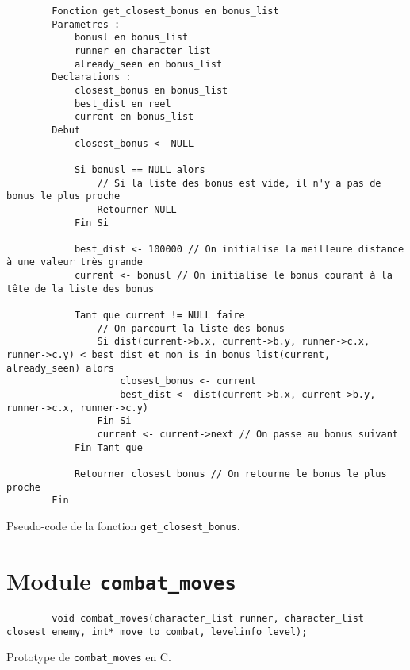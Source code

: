 \begin{listing}[!htpb]
    \begin{verbatim}
        Fonction get_closest_bonus en bonus_list
        Parametres :
            bonusl en bonus_list
            runner en character_list
            already_seen en bonus_list
        Declarations :
            closest_bonus en bonus_list
            best_dist en reel
            current en bonus_list
        Debut
            closest_bonus <- NULL

            Si bonusl == NULL alors
                // Si la liste des bonus est vide, il n'y a pas de bonus le plus proche
                Retourner NULL
            Fin Si

            best_dist <- 100000 // On initialise la meilleure distance à une valeur très grande
            current <- bonusl // On initialise le bonus courant à la tête de la liste des bonus

            Tant que current != NULL faire
                // On parcourt la liste des bonus
                Si dist(current->b.x, current->b.y, runner->c.x, runner->c.y) < best_dist et non is_in_bonus_list(current, already_seen) alors
                    closest_bonus <- current
                    best_dist <- dist(current->b.x, current->b.y, runner->c.x, runner->c.y)
                Fin Si
                current <- current->next // On passe au bonus suivant
            Fin Tant que

            Retourner closest_bonus // On retourne le bonus le plus proche
        Fin
    \end{verbatim}
    \caption{Pseudo-code de la fonction \texttt{get\_closest\_bonus}.}
    \label{listing:c-get_closest_bonus}
\end{listing}

\newpage

\section{Module \texttt{combat\_moves}}
\label{sec:move-to-combat}

\begin{listing}[!htpb]
    \begin{verbatim}
        void combat_moves(character_list runner, character_list closest_enemy, int* move_to_combat, levelinfo level);
    \end{verbatim}
    \caption{Prototype de \texttt{combat\_moves} en C.}
    \label{listing:c-combat_moves-prototype}
\end{listing}

